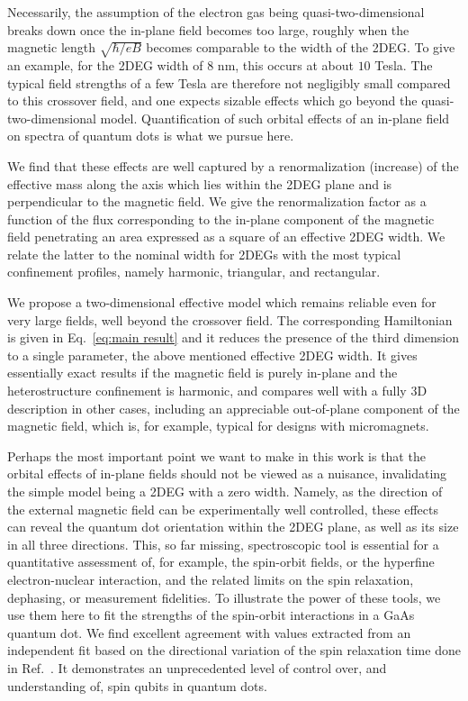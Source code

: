 \documentclass[aps,floatfix,twocolumn,showpacs,10pt,nofootinbib]{revtex4-1}
\begin{document}
Necessarily, the assumption of the electron gas being quasi-two-dimensional breaks down once the in-plane field becomes too large, roughly when the magnetic length $\sqrt{\hbar /eB}$ becomes comparable to the width of the 2DEG. To give an example, for the 2DEG width of 8 nm, this occurs at about $10$ Tesla. The typical field strengths of a few Tesla are therefore not negligibly small compared to this crossover field, and one expects sizable effects which go beyond the quasi-two-dimensional model.\cite{zumbuhl2004:PRB,zumbuhl2005:PRB} Quantification of such orbital effects of an in-plane field on spectra of quantum dots is what we pursue here.

We find that these effects are well captured by a renormalization (increase) of the effective mass along the axis which lies within the 2DEG plane and is perpendicular to the magnetic field. We give the renormalization factor as a function of the flux corresponding to the in-plane component of the magnetic field penetrating an area expressed as a square of an effective 2DEG width. We relate the latter to the nominal width for 2DEGs with the most typical confinement profiles, namely harmonic, triangular, and rectangular.

We propose a two-dimensional effective model which remains reliable even for very large fields, well beyond the crossover field. The corresponding Hamiltonian is given in Eq.~\eqref{eq:main result} and it reduces the presence of the third dimension to a single parameter, the above mentioned effective 2DEG width. It gives essentially exact results if the magnetic field is purely in-plane and the heterostructure confinement is harmonic, and compares well with a fully 3D description in other cases, including an appreciable out-of-plane component of the magnetic field, which is, for example, typical for designs with micromagnets.\cite{otsuka2016:SR,yoneda2015:APE}

Perhaps the most important point we want to make in this work is that the orbital effects of in-plane fields should not be viewed as a nuisance, invalidating the simple model being a 2DEG with a zero width. Namely, as the direction of the external magnetic field can be experimentally well controlled, these effects can reveal the quantum dot orientation within the 2DEG plane, as well as its size in all three directions.\cite{yu} This, so far missing, spectroscopic tool is essential for a quantitative assessment of, for example, the spin-orbit fields,\cite{scarlino2014:PRL} or the hyperfine electron-nuclear interaction, and the related limits on the spin relaxation,\cite{camenzind,malkoc2016:PRB} dephasing,\cite{delbecq2016:PRL} or measurement fidelities.\cite{nakajima2017:PRL} To illustrate the power of these tools, we use them here to fit the strengths of the spin-orbit interactions in a GaAs quantum dot. We find excellent agreement with values extracted from an independent fit based on the directional variation of the spin relaxation time done in Ref.~. It demonstrates an unprecedented level of control over, and understanding of, spin qubits in quantum dots.
\end{document}
